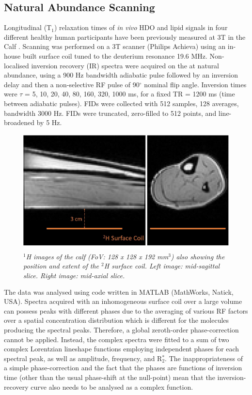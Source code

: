 \documentclass[class=article, crop=false]{standalone}
\begin{document}
\subsection{Natural Abundance Scanning}

Longitudinal (T$_1$) relaxation times of \textit{in vivo} HDO and lipid signals in four different healthy human participants have been previously measured at 3T in the Calf \cite{Damion2021NaturalT}. Scanning was performed on a 3T scanner (Philips Achieva) using an in-house built surface coil tuned to the deuterium resonance 19.6 MHz. Non-localised inversion recovery (IR) spectra were acquired on the at natural abundance, using a 900 Hz bandwidth adiabatic pulse followed by an inversion delay and then a non-selective RF pulse of 90$^\circ$ nominal flip angle. Inversion times were $\tau$ = {5, 10, 20, 40, 80, 160, 320, 1000} ms, for a fixed TR = 1200 ms (time between adiabatic pulses). FIDs were collected with 512 samples, 128 averages, bandwidth 3000 Hz. FIDs were truncated, zero-filled to 512 points, and line-broadened by 5 Hz. %

\begin{figure}
    \centering
    \includegraphics[width=1\textwidth]{Figures/Lipid/Coil.jpg}
    \caption{\textit{$^1$H images of the calf (FoV: 128 x 128 x 192 mm$^3$) also showing the position and extent of the $^2$H surface coil. Left image: mid-sagittal slice. Right image: mid-axial slice.}}
    \label{fig:Lip:Coil}
\end{figure}

The data was analysed using code written in MATLAB (MathWorks, Natick, USA). Spectra acquired with an inhomogeneous surface coil over a large volume can possess peaks with different phases due to the averaging of various RF factors over a spatial concentration distribution which is different for the molecules producing the spectral peaks. Therefore, a global zeroth-order phase-correction cannot be applied. Instead, the complex spectra were fitted to a sum of two complex Lorentzian lineshape functions employing independent phases for each spectral peak, as well as amplitude, frequency, and R$_2^*$. The inappropriateness of a simple phase-correction and the fact that the phases are functions of inversion time (other than the usual phase-shift at the null-point) mean that the inversion-recovery curve also needs to be analysed as a complex function.
\end{document}
